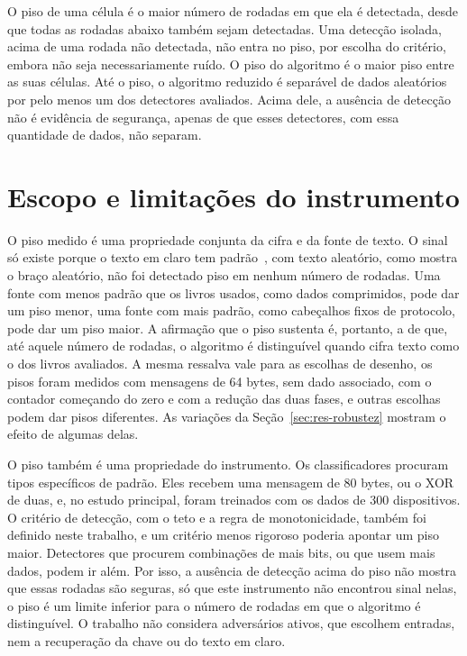 O piso de uma célula é o maior número de rodadas em que ela é detectada, desde que todas as rodadas abaixo também sejam detectadas. Uma detecção isolada, acima de uma rodada não detectada, não entra no piso, por escolha do critério, embora não seja necessariamente ruído. O piso do algoritmo é o maior piso entre as suas células. Até o piso, o algoritmo reduzido é separável de dados aleatórios por pelo menos um dos detectores avaliados. Acima dele, a ausência de detecção não é evidência de segurança, apenas de que esses detectores, com essa quantidade de dados, não separam.

\section{Escopo e limitações do instrumento}
\label{sec:met-escopo}

O piso medido é uma propriedade conjunta da cifra e da fonte de texto. O sinal só existe porque o texto em claro tem padrão~\cite{shannon_1949}, com texto aleatório, como mostra o braço aleatório, não foi detectado piso em nenhum número de rodadas. Uma fonte com menos padrão que os livros usados, como dados comprimidos, pode dar um piso menor, uma fonte com mais padrão, como cabeçalhos fixos de protocolo, pode dar um piso maior. A afirmação que o piso sustenta é, portanto, a de que, até aquele número de rodadas, o algoritmo é distinguível quando cifra texto como o dos livros avaliados. A mesma ressalva vale para as escolhas de desenho, os pisos foram medidos com mensagens de 64 bytes, sem dado associado, com o contador começando do zero e com a redução das duas fases, e outras escolhas podem dar pisos diferentes. As variações da Seção~\ref{sec:res-robustez} mostram o efeito de algumas delas.

O piso também é uma propriedade do instrumento. Os classificadores procuram tipos específicos de padrão. Eles recebem uma mensagem de 80 bytes, ou o XOR de duas, e, no estudo principal, foram treinados com os dados de 300 dispositivos. O critério de detecção, com o teto e a regra de monotonicidade, também foi definido neste trabalho, e um critério menos rigoroso poderia apontar um piso maior. Detectores que procurem combinações de mais bits, ou que usem mais dados, podem ir além. Por isso, a ausência de detecção acima do piso não mostra que essas rodadas são seguras, só que este instrumento não encontrou sinal nelas, o piso é um limite inferior para o número de rodadas em que o algoritmo é distinguível. O trabalho não considera adversários ativos, que escolhem entradas, nem a recuperação da chave ou do texto em claro.

